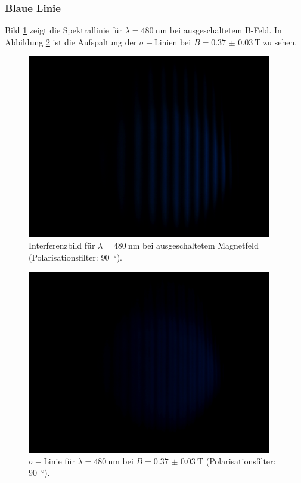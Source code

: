\subsubsection{Blaue Linie}
Bild \ref{fig:blau_pi_0A} zeigt die Spektrallinie für $\lambda=\SI{480}{\nano\meter}$ bei ausgeschaltetem B-Feld.
In Abbildung \ref{fig:blau_pi_6A} ist die Aufspaltung der $\sigma-$Linien bei $B=\SI{0.37(3)}{\tesla}$ zu sehen.
\begin{figure}[htb]
  \centering
  \includegraphics[height=8cm]{content/pictures/blau_pi_0A.JPG}
  \caption{Interferenzbild für $\lambda=\SI{480}{\nano\meter}$ bei ausgeschaltetem Magnetfeld (Polarisationsfilter: \SI{90}{\degree}).}
  \label{fig:blau_pi_0A}
\end{figure}
\begin{figure}[htb]
  \centering
  \includegraphics[height=8cm]{content/pictures/blau_pi_6A.JPG}
  \caption{$\sigma-$Linie für $\lambda=\SI{480}{\nano\meter}$ bei $B=\SI{0.37(3)}{\tesla}$ (Polarisationsfilter: \SI{90}{\degree}).}
  \label{fig:blau_pi_6A}
\end{figure}

